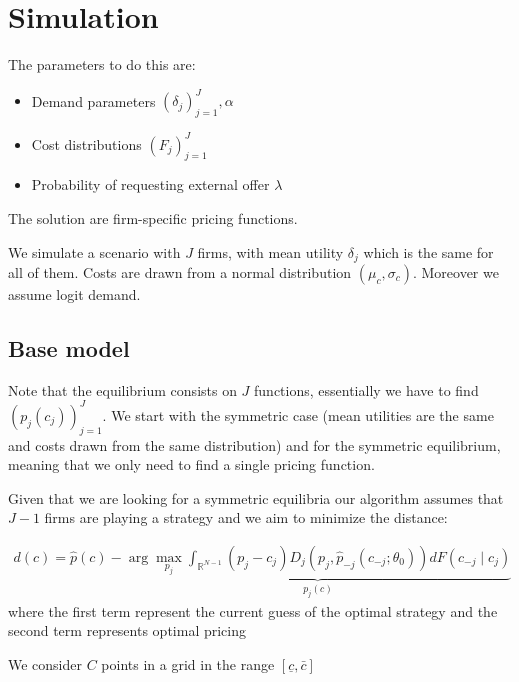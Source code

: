 \documentclass[12pt]{article}
\begin{document}
 
\section{Simulation}
The parameters to do this are: 
\begin{itemize}
    \item Demand parameters $(\delta_j)_{j=1}^J, \alpha$
    \item Cost distributions $(F_j)_{j=1}^J$
    \item Probability of requesting external offer $\lambda$
\end{itemize}

The solution are firm-specific pricing functions. 

\medskip

We simulate a scenario with $J$ firms, with mean utility $\delta_j$ which is the same for all of them. Costs are drawn from a normal distribution $(\mu_c, \sigma_c)$. %
Moreover we assume logit demand. 
\subsection{Base model}
Note that the equilibrium consists on $J$ functions, essentially we have to find $(p_j(c_j))_{j=1}^J$. We start with the symmetric case (mean utilities are the same and costs drawn from the same distribution) and for the symmetric equilibrium, meaning that we only need to find a single pricing function. 

Given that we are looking for a symmetric equilibria our algorithm assumes that $J-1$ firms are playing a strategy  and we aim to minimize the distance: 


\begin{align} %
    d(c) = \hat{p}(c) -\underbrace{\arg \max_{p_j} \int_{\mathbb{R}^{N-1}}^{} (p_j - c_j) D_j(p_j, \hat{p}_{-j}(c_{-j}; \theta_0)) dF(c_{-j} \mid c_j)}_{p_j(c)}
\end{align} 
where the first term represent the current guess of the optimal strategy and the  second term represents optimal pricing 


We consider $C$ points in a grid in the range $[\underline{c}, \bar{c}] $
\end{document}
